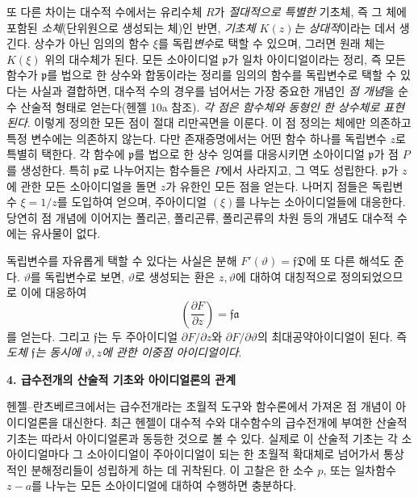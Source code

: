 또 다른 차이는 대수적 수에서는 유리수체 \(R\)가 \emph{절대적으로 특별한} 기초체, 즉 그 체에 포함된 \emph{소체}(단위원으로 생성되는 체)인 반면, \emph{기초체 \(K(z)\)는 상대적}이라는 데서 생긴다. 상수가 아닌 임의의 함수 \(\xi\)를 독립\emph{변수}로 택할 수 있으며, 그러면 원래 체는 \(K(\xi)\) 위의 대수체가 된다. 모든 소아이디얼 \(\mathfrak p\)가 일차 아이디얼이라는 정리, 즉 모든 함수가 \(\mathfrak p\)를 법으로 한 상수와 합동이라는 정리를 임의의 함수를 독립변수로 택할 수 있다는 사실과 결합하면, 대수적 수의 경우를 넘어서는 가장 중요한 개념인 \emph{점 개념}을 순수 산술적 형태로 얻는다(헨젤 10a 참조). \emph{각 점은 함수체와 동형인 한 상수체로 표현된다}. 이렇게 정의한 모든 점이 \glqq{}절대 리만곡면\grqq{}을 이룬다. 이 점 정의는 체에만 의존하고 특정 변수에는 의존하지 않는다. 다만 존재증명에서는 어떤 함수 하나를 독립변수 \(z\)로 특별히 택한다. 각 함수에 \(\mathfrak p\)를 법으로 한 상수 잉여를 대응시키면 소아이디얼 \(\mathfrak p\)가 점 \(P\)를 생성한다. 특히 \(\mathfrak p\)로 나누어지는 함수들은 \(P\)에서 사라지고, 그 역도 성립한다. \(\mathfrak p\)가 \(z\)에 관한 모든 소아이디얼을 돌면 \(z\)가 유한인 모든 점을 얻는다. 나머지 점들은 독립변수 \(\xi=1/z\)를 도입하여 얻으며, 주아이디얼 \((\xi)\)를 나누는 소아이디얼들에 대응한다. 당연히 점 개념에 이어지는 폴리곤, 폴리곤류, 폴리곤류의 차원 등의 개념도 대수적 수에는 유사물이 없다.

독립변수를 자유롭게 택할 수 있다는 사실은 분해 \(F'(\vartheta)=\mathfrak f\mathfrak D\)에 또 다른 해석도 준다. \(\vartheta\)를 독립변수로 보면, \(\vartheta\)로 생성되는 환은 \(z,\vartheta\)에 대하여 대칭적으로 정의되었으므로 이에 대응하여
\[
\left(\frac{\partial F}{\partial z}\right)=\mathfrak f\mathfrak a
\]
를 얻는다. 그리고 \(\mathfrak f\)는 두 주아이디얼 \(\partial F/\partial z\)와 \(\partial F/\partial\vartheta\)의 최대공약아이디얼이 된다. 즉 \emph{도체 \(\mathfrak f\)는 동시에 \(\vartheta,z\)에 관한 \glqq{}이중점 아이디얼\grqq{}이다}.

\begin{center}
\textbf{4. 급수전개의 산술적 기초와 아이디얼론의 관계}
\end{center}

헨젤--란츠베르크에서는 급수전개라는 초월적 도구와 함수론에서 가져온 점 개념이 아이디얼론을 대신한다. 최근 헨젤이 대수적 수와 대수함수의 급수전개에 부여한 산술적 기초는 따라서 아이디얼론과 동등한 것으로 볼 수 있다. 실제로 이 산술적 기초는 각 소아이디얼마다 그 소아이디얼이 주아이디얼이 되는 한 초월적 확대체로 넘어가서 통상적인 분해정리들이 성립하게 하는 데 귀착된다. 이 고찰은 한 소수 \(p\), 또는 일차함수 \(z-a\)를 나누는 모든 소아이디얼에 대하여 수행하면 충분하다.

